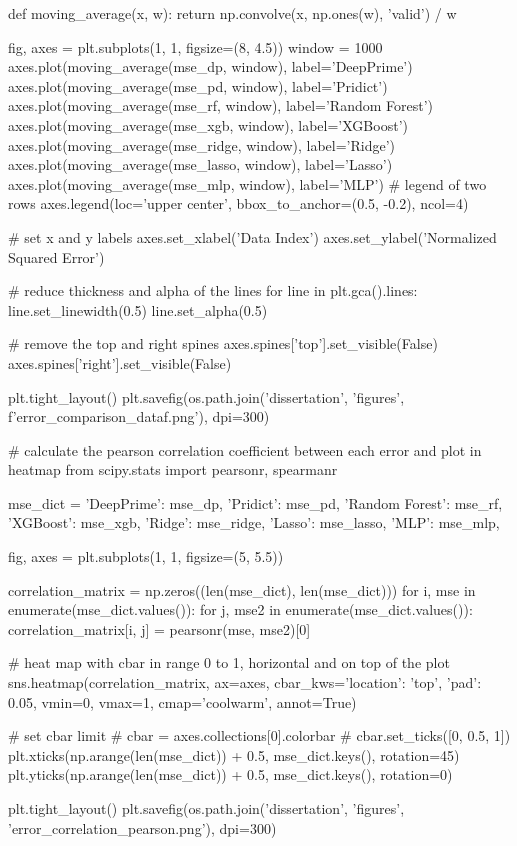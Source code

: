 def moving_average(x, w):
    return np.convolve(x, np.ones(w), 'valid') / w


fig, axes = plt.subplots(1, 1, figsize=(8, 4.5))
window = 1000
axes.plot(moving_average(mse_dp, window), label='DeepPrime')
axes.plot(moving_average(mse_pd, window), label='Pridict')
axes.plot(moving_average(mse_rf, window), label='Random Forest')
axes.plot(moving_average(mse_xgb, window), label='XGBoost')
axes.plot(moving_average(mse_ridge, window), label='Ridge')
axes.plot(moving_average(mse_lasso, window), label='Lasso')
axes.plot(moving_average(mse_mlp, window), label='MLP')
# legend of two rows
axes.legend(loc='upper center', bbox_to_anchor=(0.5, -0.2), ncol=4)

# set x and y labels
axes.set_xlabel('Data Index')
axes.set_ylabel('Normalized Squared Error')


# reduce thickness and alpha of the lines
for line in plt.gca().lines:
    line.set_linewidth(0.5)
    line.set_alpha(0.5)

# remove the top and right spines
axes.spines['top'].set_visible(False)
axes.spines['right'].set_visible(False)

plt.tight_layout()
plt.savefig(os.path.join('dissertation', 'figures', f'error_comparison_{dataf}.png'), dpi=300)

# calculate the pearson correlation coefficient between each error and plot in heatmap
from scipy.stats import pearsonr, spearmanr

mse_dict = {
    'DeepPrime': mse_dp,
    'Pridict': mse_pd,
    'Random Forest': mse_rf,
    'XGBoost': mse_xgb,
    'Ridge': mse_ridge,
    'Lasso': mse_lasso,
    'MLP': mse_mlp,
}

fig, axes = plt.subplots(1, 1, figsize=(5, 5.5))

correlation_matrix = np.zeros((len(mse_dict), len(mse_dict)))
for i, mse in enumerate(mse_dict.values()):
    for j, mse2 in enumerate(mse_dict.values()):
        correlation_matrix[i, j] = pearsonr(mse, mse2)[0]

# heat map with cbar in range 0 to 1, horizontal and on top of the plot
sns.heatmap(correlation_matrix, ax=axes, cbar_kws={'location': 'top', 'pad': 0.05}, vmin=0, vmax=1, cmap='coolwarm', annot=True)

# set cbar limit
# cbar = axes.collections[0].colorbar
# cbar.set_ticks([0, 0.5, 1])
plt.xticks(np.arange(len(mse_dict)) + 0.5, mse_dict.keys(), rotation=45)
plt.yticks(np.arange(len(mse_dict)) + 0.5, mse_dict.keys(), rotation=0)

plt.tight_layout()
plt.savefig(os.path.join('dissertation', 'figures', 'error_correlation_pearson.png'), dpi=300)

